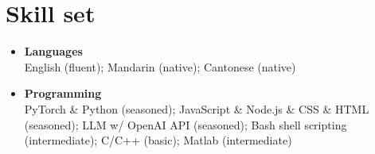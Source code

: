 \documentclass[letterpaper,11pt]{article}
\begin{document}
    \section{Skill set}

    \begin{itemize}[leftmargin=0.15in, label={}, itemsep=0em]
        \item \textbf{Languages}\\
        English (fluent); Mandarin (native); Cantonese (native)
        \item \textbf{Programming}\\
        PyTorch \& Python (seasoned); JavaScript \& Node.js \& CSS \& HTML (seasoned); LLM w/ OpenAI API (seasoned); Bash shell scripting (intermediate); C/C++ (basic); Matlab (intermediate)
    \end{itemize}
\end{document}
